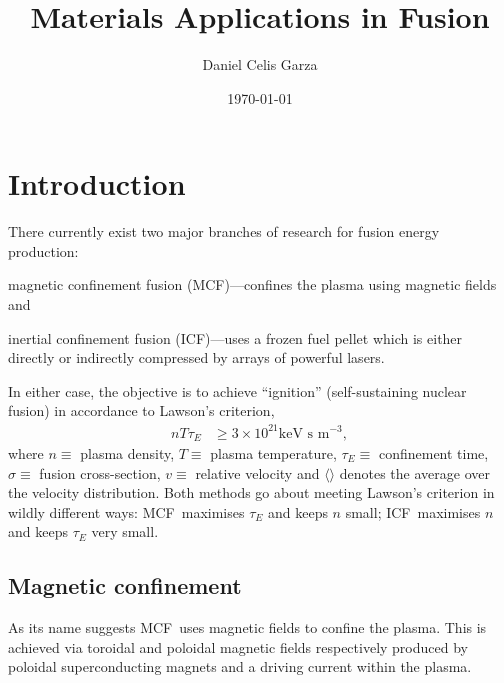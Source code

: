 \documentclass[12pt, a4paper]{article}
\title{Materials Applications in Fusion}
\author{Daniel Celis Garza}
\date{\today}
\newcommand{\mc}{MCF}
\newcommand{\ic}{ICF}
\begin{document}
	\maketitle
	\section{Introduction}\label{s:intro}
		There currently exist two major branches of research for fusion energy production:
		\begin{inparaenum}
			\item magnetic confinement fusion (\mc)---confines the plasma using magnetic fields and
			\item inertial confinement fusion (\ic)---uses a frozen fuel pellet which is either directly or indirectly compressed by arrays of powerful lasers.
		\end{inparaenum}
		In either case, the objective is to achieve ``ignition'' (self-sustaining nuclear fusion) in accordance to Lawson's criterion,
			\begin{align}
				n T \tau_{E} &\geq 3 \times 10^{21} \textrm{keV s m$^{-3}$},
			\end{align}
		where $ n \equiv $ plasma density, $ T \equiv $ plasma temperature, $ \tau_{E} \equiv $ confinement time, $ \sigma \equiv $ fusion cross-section, $ v \equiv $ relative velocity and $ \langle \rangle $ denotes the average over the velocity distribution. Both methods go about meeting Lawson's criterion in wildly different ways: \mc~maximises $ \tau_{E} $ and keeps $ n $ small; \ic~maximises $ n $ and keeps $ \tau_{E} $ very small.
		\subsection{Magnetic confinement}\label{s:mc}
			As its name suggests \mc~uses magnetic fields to confine the plasma. This is achieved via toroidal and poloidal magnetic fields respectively produced by poloidal superconducting magnets and a driving current within the plasma.
			
\end{document}
